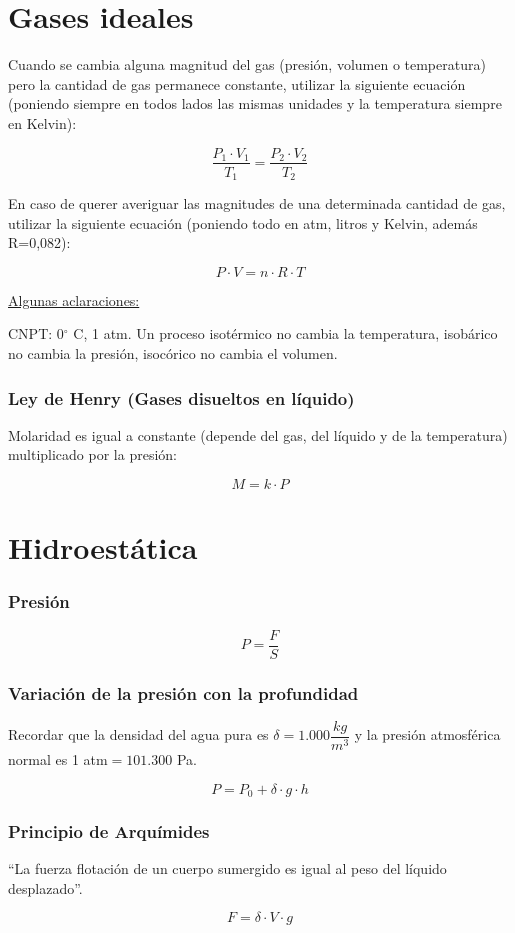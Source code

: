 \section{Gases ideales}

Cuando se cambia alguna magnitud del gas (presión, volumen o temperatura) pero la cantidad de gas permanece constante, utilizar la siguiente ecuación (poniendo siempre en todos lados las mismas unidades y la temperatura siempre en Kelvin):

$$ \dfrac{P_1 \cdot V_1}{T_1} = \dfrac{P_2 \cdot V_2}{T_2}$$

En caso de querer averiguar las magnitudes de una determinada cantidad de gas, utilizar la siguiente ecuación (poniendo todo en atm, litros y Kelvin, además R=0,082):

$$ P \cdot V = n \cdot R \cdot T$$

\underline{Algunas aclaraciones:}

\skipline
CNPT: 0$^\circ$ C, 1 atm. Un proceso isotérmico no cambia la temperatura, isobárico no cambia la presión, isocórico no cambia el volumen.
\subsubsection*{Ley de Henry (Gases disueltos en líquido)}

Molaridad es igual a constante (depende del gas, del líquido y de la temperatura) multiplicado por la presión:

$$M = k \cdot P$$

\section{Hidroestática}

\subsubsection*{Presión}

$$P = \dfrac{F}{S}$$

\subsubsection*{Variación de la presión con la profundidad} 

Recordar que la densidad del agua pura es $\delta=1.000 \dfrac{kg}{m^3}$ y la presión atmosférica normal es 1 atm$=101.300$ Pa.

$$P = P_0 + \delta \cdot g \cdot h$$

\subsubsection*{Principio de Arquímides}

``La fuerza flotación de un cuerpo sumergido es igual al peso del líquido desplazado''.

$$F = \delta \cdot V \cdot g$$
